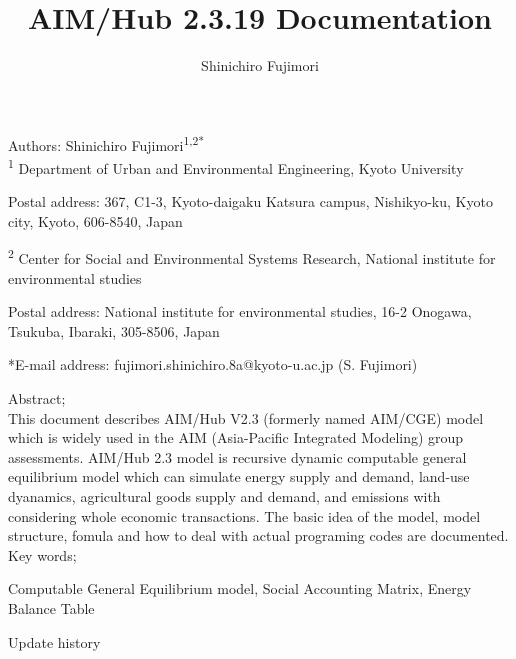 \documentclass[10pt,a4paper,titlepage,dvipdfmx]{book}
\title{AIM/Hub 2.3.19 Documentation}
\author{Shinichiro Fujimori}
\begin{document}
\maketitle

\begin{flushleft}
Authors: Shinichiro Fujimori\textsuperscript{1,2*} \linebreak\linebreak\linebreak\\

\textsuperscript{1} Department of Urban and Environmental Engineering, Kyoto University

Postal address: 367, C1-3, Kyoto-daigaku Katsura campus, Nishikyo-ku, Kyoto city, Kyoto, 606-8540, Japan 

\textsuperscript{2} Center for Social and Environmental Systems Research, National institute for environmental studies

Postal address: National institute for environmental studies, 16-2 Onogawa, Tsukuba, Ibaraki, 305-8506, Japan 

*E-mail address: fujimori.shinichiro.8a@kyoto-u.ac.jp (S. Fujimori)\linebreak\linebreak\linebreak\linebreak

Abstract;
\\
This document describes AIM/Hub V2.3 (formerly named AIM/CGE) model which is widely used in the AIM (Asia-Pacific Integrated Modeling) group assessments. AIM/Hub 2.3 model is recursive dynamic computable general equilibrium model which can simulate energy supply and demand, land-use dyanamics, agricultural goods supply and demand, and emissions with considering whole economic transactions. The basic idea of the model, model structure, fomula and how to deal with actual programing codes are documented.
\linebreak\linebreak\\

Key words;

Computable General Equilibrium model, Social Accounting Matrix, Energy Balance Table
\end{flushleft}

\newpage

{\large Update history}
\end{document}
